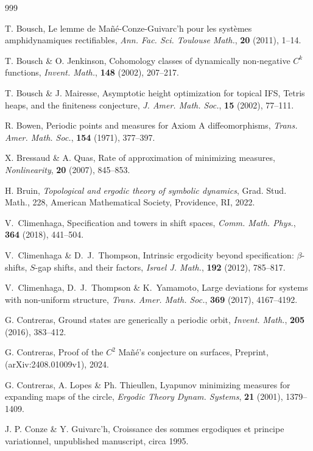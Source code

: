 \documentclass[reqno,11pt]{amsart}
\theoremstyle{definition}
\theoremstyle{remark}
\theoremstyle{remark}
\numberwithin{equation}{section}
\begin{document}
\begin{thebibliography}{999}
	
	 T. Bousch, Le lemme de Ma\~n\'{e}-Conze-Guivarc'h pour les syst\`{e}mes amphidynamiques rectifiables,
{\it  Ann. Fac. Sci. Toulouse Math.}, {\bf 20} (2011), 1--14.

     T. Bousch \& O. Jenkinson, Cohomology classes of dynamically non-negative $C^k$ functions, 
{\it Invent.
    Math.}, {\bf 148} (2002), 207--217.

T. Bousch \& J. Mairesse,
Asymptotic height optimization for topical IFS, Tetris heaps, and the finiteness conjecture,
{\it  J. Amer. Math. Soc.}, {\bf 15} (2002), 77--111.

 R. Bowen, Periodic points and measures for Axiom A diffeomorphisms, 
{\it Trans. Amer. Math.
 Soc.}, {\bf 154} (1971), 377--397.



	 X. Bressaud \&  A. Quas, Rate of approximation of minimizing measures,
{\it Nonlinearity}, {\bf 20} (2007), 845--853.




 H. Bruin,
{\it Topological and ergodic theory of symbolic dynamics},
Grad. Stud. Math., 228,
American Mathematical Society, Providence, RI, 2022.

 V.~Climenhaga,
Specification and towers in shift spaces,
{\it Comm. Math. Phys.}, {\bf 364} (2018), 441--504.

 V.~Climenhaga \&  D.~J.~Thompson, 
Intrinsic ergodicity beyond specification: $\beta$-shifts, $S$-gap shifts, and their factors,
{\it Israel J. Math.}, {\bf 192} (2012), 785--817.

 V.~Climenhaga, D.~J.~Thompson \& K.~Yamamoto,
Large deviations for systems with non-uniform structure,
{\it Trans. Amer. Math. Soc.}, {\bf 369} (2017), 4167--4192.



 G. Contreras, Ground states are generically a periodic orbit,
{\it Invent. Math.}, {\bf 205} (2016), 383--412.

 G. Contreras,
Proof of the $C^2$ Ma\~n\'e's conjecture on surfaces,
Preprint, (arXiv:2408.01009v1), 2024.


	 G. Contreras, A. Lopes \& Ph. Thieullen, Lyapunov minimizing measures for expanding maps of the
	circle, {\it Ergodic Theory Dynam. Systems}, {\bf 21} (2001), 1379--1409.
	
J. P. Conze \& Y. Guivarc'h,
Croissance des sommes ergodiques et principe variationnel,
unpublished manuscript, circa 1995.


\end{thebibliography}
\end{document}
